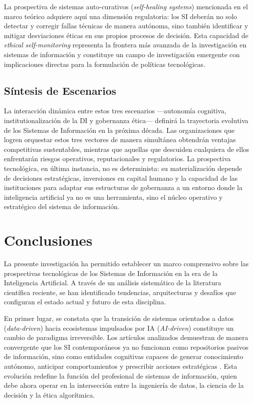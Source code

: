 \documentclass[conference]{IEEEtran}
\begin{document}
La prospectiva de sistemas auto-curativos (\textit{self-healing systems}) mencionada en el marco teórico adquiere aquí una dimensión regulatoria: los SI deberán no solo detectar y corregir fallas técnicas de manera autónoma, sino también identificar y mitigar desviaciones éticas en sus propios procesos de decisión. Esta capacidad de \textit{ethical self-monitoring} representa la frontera más avanzada de la investigación en sistemas de información y constituye un campo de investigación emergente con implicaciones directas para la formulación de políticas tecnológicas.

\subsection{Síntesis de Escenarios}
La interacción dinámica entre estos tres escenarios —autonomía cognitiva, institutionalización de la DI y gobernanza ética— definirá la trayectoria evolutiva de los Sistemas de Información en la próxima década. Las organizaciones que logren orquestar estos tres vectores de manera simultánea obtendrán ventajas competitivas sustentables, mientras que aquellas que descuiden cualquiera de ellos enfrentarán riesgos operativos, reputacionales y regulatorios. La prospectiva tecnológica, en última instancia, no es determinista: su materialización depende de decisiones estratégicas, inversiones en capital humano y la capacidad de las instituciones para adaptar sus estructuras de gobernanza a un entorno donde la inteligencia artificial ya no es una herramienta, sino el núcleo operativo y estratégico del sistema de información.




\section{Conclusiones}
La presente investigación ha permitido establecer un marco comprensivo sobre las prospectivas tecnológicas de los Sistemas de Información en la era de la Inteligencia Artificial. A través de un análisis sistemático de la literatura científica reciente, se han identificado tendencias, arquitecturas y desafíos que configuran el estado actual y futuro de esta disciplina.

En primer lugar, se constata que la transición de sistemas orientados a datos (\textit{data-driven}) hacia ecosistemas impulsados por IA (\textit{AI-driven}) constituye un cambio de paradigma irreversible. Los artículos analizados demuestran de manera convergente que los SI contemporáneos ya no funcionan como repositorios pasivos de información, sino como entidades cognitivas capaces de generar conocimiento autónomo, anticipar comportamientos y prescribir acciones estratégicas \cite{natta2025, seth2025, tasleem2024}. Esta evolución redefine la función del profesional de sistemas de información, quien debe ahora operar en la intersección entre la ingeniería de datos, la ciencia de la decisión y la ética algorítmica.
\end{document}
